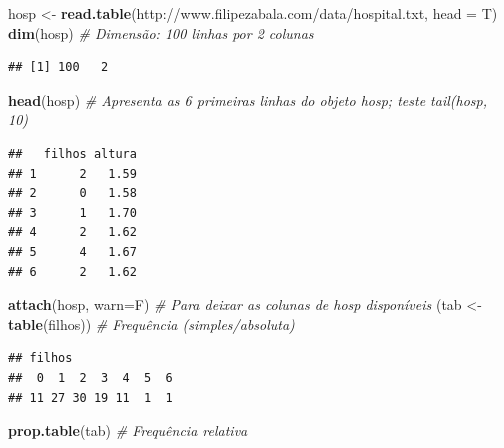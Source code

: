 \documentclass[
]{book}
\newenvironment{Shaded}{\begin{snugshade}}{\end{snugshade}}
\newcommand{\CommentTok}[1]{\textcolor[rgb]{0.56,0.35,0.01}{\textit{#1}}}
\newcommand{\DataTypeTok}[1]{\textcolor[rgb]{0.13,0.29,0.53}{#1}}
\newcommand{\KeywordTok}[1]{\textcolor[rgb]{0.13,0.29,0.53}{\textbf{#1}}}
\newcommand{\NormalTok}[1]{#1}
\newcommand{\StringTok}[1]{\textcolor[rgb]{0.31,0.60,0.02}{#1}}
\theoremstyle{definition}
\theoremstyle{definition}
\theoremstyle{definition}
\theoremstyle{remark}
\begin{document}
\begin{Shaded}
\begin{Highlighting}[]
\NormalTok{hosp \textless{}{-}}\StringTok{ }\KeywordTok{read.table}\NormalTok{(}\StringTok{\textquotesingle{}http://www.filipezabala.com/data/hospital.txt\textquotesingle{}}\NormalTok{, }\DataTypeTok{head =}\NormalTok{ T)}
\KeywordTok{dim}\NormalTok{(hosp)       }\CommentTok{\# Dimensão: 100 linhas por 2 colunas}
\end{Highlighting}
\end{Shaded}

\begin{verbatim}
## [1] 100   2
\end{verbatim}

\begin{Shaded}
\begin{Highlighting}[]
\KeywordTok{head}\NormalTok{(hosp)      }\CommentTok{\# Apresenta as 6 primeiras linhas do objeto \textquotesingle{}hosp\textquotesingle{}; teste tail(hosp, 10)}
\end{Highlighting}
\end{Shaded}

\begin{verbatim}
##   filhos altura
## 1      2   1.59
## 2      0   1.58
## 3      1   1.70
## 4      2   1.62
## 5      4   1.67
## 6      2   1.62
\end{verbatim}

\begin{Shaded}
\begin{Highlighting}[]
\KeywordTok{attach}\NormalTok{(hosp, }\DataTypeTok{warn=}\NormalTok{F)                      }\CommentTok{\# Para deixar as colunas de \textquotesingle{}hosp\textquotesingle{} disponíveis}
\NormalTok{(tab \textless{}{-}}\StringTok{ }\KeywordTok{table}\NormalTok{(filhos))                    }\CommentTok{\# Frequência (simples/absoluta)}
\end{Highlighting}
\end{Shaded}

\begin{verbatim}
## filhos
##  0  1  2  3  4  5  6 
## 11 27 30 19 11  1  1
\end{verbatim}

\begin{Shaded}
\begin{Highlighting}[]
\KeywordTok{prop.table}\NormalTok{(tab)                           }\CommentTok{\# Frequência relativa}
\end{Highlighting}
\end{Shaded}
\end{document}
